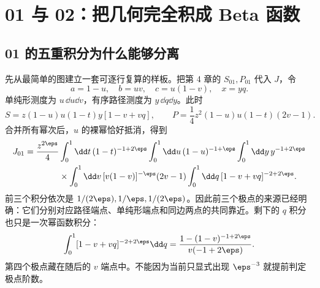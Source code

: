 \chapter{01 与 02：把几何完全积成 Beta 函数}
\section{01 的五重积分为什么能够分离}
先从最简单的图建立一套可逐行复算的样板。把第 4 章的 $S_{01},P_{01}$ 代入 $J$，令
\begin{equation}
a=1-u,\quad b=uv,\quad c=u(1-v),\quad x=yq.
\end{equation}
单纯形测度为 $u\,\dd u\dd v$，有序路径测度为 $y\,\dd q\dd y$。此时
\[
S=z(1-u)u(1-t)y[1-v+vq],\qquad
P=\frac14z^2(1-u)u(1-t)(2v-1).
\]
合并所有幂次后，$u$ 的裸幂恰好抵消，得到
\begin{equation}
\begin{aligned}
J_{01}={z^{2\eps}\over4}
&\int_0^1\dd t\,(1-t)^{-1+2\eps}
\int_0^1\dd u\,(1-u)^{-1+\eps}
\int_0^1\dd y\,y^{-1+2\eps}\\
&\times\int_0^1\dd v\,[v(1-v)]^{-\eps}(2v-1)
\int_0^1\dd q\,[1-v+vq]^{-2+2\eps}.
\end{aligned}
\label{eq:J01factor}
\end{equation}
前三个积分依次是 $1/(2\eps),1/\eps,1/(2\eps)$。因此前三个极点的来源已经明确：它们分别对应路径端点、单纯形端点和同边两点的共同靠近。剩下的 $q$ 积分也只是一次幂函数积分：
\begin{equation}
\int_0^1[1-v+vq]^{-2+2\eps}\dd q
=\frac{1-(1-v)^{-1+2\eps}}{v(-1+2\eps)}.
\end{equation}
第四个极点藏在随后的 $v$ 端点中。不能因为当前只显式出现 $\eps^{-3}$ 就提前判定极点阶数。

